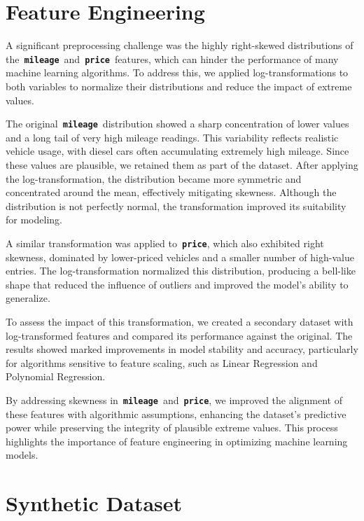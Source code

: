 \documentclass[a4paper,oneside,bibliography=totoc]{scrbook}
\begin{document}
\section{Feature Engineering}
\label{sec:featureEngineering}

A significant preprocessing challenge was the highly right-skewed distributions of the~\textbf{\texttt{mileage}}~and~\textbf{\texttt{price}}~features, which can hinder the performance of many machine learning algorithms. To address this, we applied log-transformations to both variables to normalize their distributions and reduce the impact of extreme values.

The original~\textbf{\texttt{mileage}}~distribution showed a sharp concentration of lower values and a long tail of very high mileage readings. This variability reflects realistic vehicle usage, with diesel cars often accumulating extremely high mileage. Since these values are plausible, we retained them as part of the dataset. After applying the log-transformation, the distribution became more symmetric and concentrated around the mean, effectively mitigating skewness. Although the distribution is not perfectly normal, the transformation improved its suitability for modeling.

A similar transformation was applied to~\textbf{\texttt{price}}, which also exhibited right skewness, dominated by lower-priced vehicles and a smaller number of high-value entries. The log-transformation normalized this distribution, producing a bell-like shape that reduced the influence of outliers and improved the model's ability to generalize.

To assess the impact of this transformation, we created a secondary dataset with log-transformed features and compared its performance against the original. The results showed marked improvements in model stability and accuracy, particularly for algorithms sensitive to feature scaling, such as Linear Regression and Polynomial Regression.

By addressing skewness in~\textbf{\texttt{mileage}}~and~\textbf{\texttt{price}}, we improved the alignment of these features with algorithmic assumptions, enhancing the dataset's predictive power while preserving the integrity of plausible extreme values. This process highlights the importance of feature engineering in optimizing machine learning models.

\section{Synthetic Dataset}
\label{sec:syntheticDataset}
\end{document}
